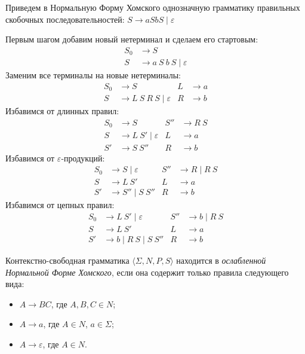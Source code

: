 \begin{example}
    Приведем в Нормальную Форму Хомского однозначную грамматику правильных скобочных последовательностей: $S \to a S b S \mid \varepsilon$

    Первым шагом добавим новый нетерминал и сделаем его стартовым:
    \begin{align*}
        S_0 & \to S                              \\
        S   & \to a \ S \ b \ S \mid \varepsilon
    \end{align*}
    Заменим все терминалы на новые нетерминалы:
    \begin{align*}
        S_0 & \to S                              & L & \to a \\
        S   & \to L \ S \ R \ S \mid \varepsilon & R & \to b
    \end{align*}
    Избавимся от длинных правил:
    \begin{align*}
        S_0 & \to S                       & S'' & \to R \ S \\
        S   & \to L \ S' \mid \varepsilon & L   & \to a     \\
        S'  & \to S \ S''                 & R   & \to b
    \end{align*}
    Избавимся от $\varepsilon$-продукций:
    \begin{align*}
        S_0 & \to S \mid \varepsilon & S'' & \to R   \mid R \ S \\
        S   & \to L \ S'             & L   & \to a              \\
        S'  & \to S'' \mid S \ S''   & R   & \to b
    \end{align*}
    Избавимся от цепных правил:
    \begin{align*}
        S_0 & \to L \ S' \mid \varepsilon   & S'' & \to b \mid R \ S \\
        S   & \to L \ S'                    & L   & \to a            \\
        S'  & \to b \mid R \ S \mid S \ S'' & R   & \to b
    \end{align*}
\end{example}

\begin{definition}
    \label{defn:wCNF}
    Контекстно-свободная грамматика $\langle \Sigma, N, P, S\rangle$ находится в \emph{ослабленной Нормальной Форме Хомского}, если она содержит только правила следующего вида:
    \begin{itemize}
        \item $A \to B C$, где $A, B, C \in N$;
        \item $A \to a$, где $A \in N$, $a \in \Sigma$;
        \item $A \to \varepsilon$, где $A \in N$.
    \end{itemize}
\end{definition}

